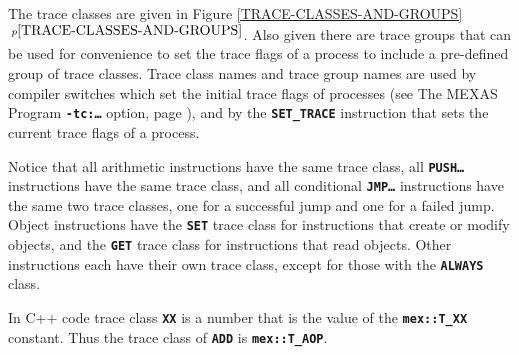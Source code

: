\documentclass[12pt]{article}
\newcommand{\TT}[1]{{\tt \bfseries #1}}
\newcommand{\itemref}[1]{\ref{#1}$\,^{p\pageref{#1}}$}
\newcommand{\EOL}{\penalty \exhyphenpenalty}
\begin{document}
The trace classes are given in Figure \itemref{TRACE-CLASSES-AND-GROUPS}.
Also given there are trace groups that can be used for convenience
to set the trace flags of a process to include
a pre-defined group of trace classes.
Trace class names and trace group names are used by compiler switches
which set the initial trace flags of processes
(see The MEXAS Program \TT{-tc:\ldots} option, page \pageref{-TC:}),
and by the
\TT{SET\_\EOL TRACE} instruction that sets the current trace flags
of a process.

Notice that all arithmetic instructions have the same
trace class, all \TT{PUSH\ldots} instructions have the same trace
class, and all conditional \TT{JMP\ldots} instructions have the
same two trace classes, one for a successful jump and one for
a failed jump.  Object instructions have the \TT{SET} trace class for
instructions that create or modify objects, and the \TT{GET} trace
class for instructions that read objects.
Other instructions each have their own trace class,
except for those with the \TT{ALWAYS} class.

In C++ code trace class \TT{XX} is a number that is the value of
the \TT{mex::T\_XX} constant.  Thus the trace class of \TT{ADD}
is \TT{mex::T\_AOP}.
\end{document}
